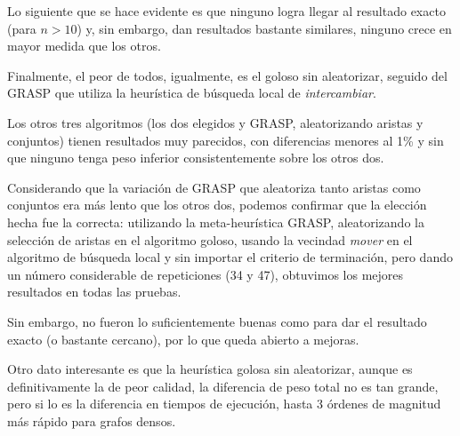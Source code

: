 Lo siguiente que se hace evidente es que ninguno logra llegar al resultado
exacto (para $n > 10$) y, sin embargo, dan resultados bastante similares,
ninguno crece en mayor medida que los otros.

Finalmente, el peor de todos, igualmente, es el goloso sin aleatorizar, seguido
del GRASP que utiliza la heurística de búsqueda local de \textit{intercambiar}.

Los otros tres algoritmos (los dos elegidos y GRASP, aleatorizando aristas y
conjuntos) tienen resultados muy parecidos, con diferencias menores al 1\% y
sin que ninguno tenga peso inferior consistentemente sobre los otros dos.

Considerando que la variación de GRASP que aleatoriza tanto aristas como
conjuntos era más lento que los otros dos, podemos confirmar que la elección
hecha fue la correcta: utilizando la meta-heurística GRASP, aleatorizando la
selección de aristas en el algoritmo goloso, usando la vecindad \textit{mover}
en el algoritmo de búsqueda local y sin importar el criterio de terminación,
pero dando un número considerable de repeticiones (34 y 47), obtuvimos los
mejores resultados en todas las pruebas.

Sin embargo, no fueron lo suficientemente buenas como para dar el resultado
exacto (o bastante cercano), por lo que queda abierto a mejoras.

Otro dato interesante es que la heurística golosa sin aleatorizar, aunque es
definitivamente la de peor calidad, la diferencia de peso total no es tan grande,
pero si lo es la diferencia en tiempos de ejecución, hasta 3 órdenes de magnitud
más rápido para grafos densos.

